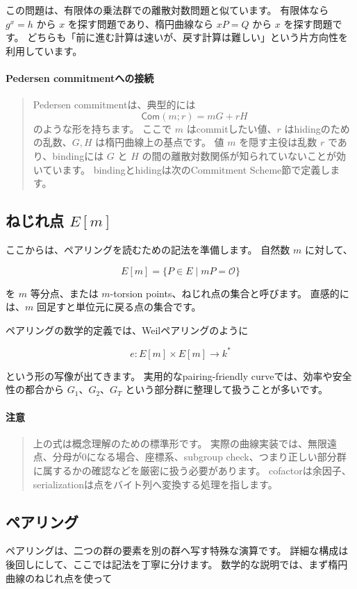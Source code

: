 \documentclass[a4paper,11pt]{ltjsarticle}
\newcommand{\Com}{\mathsf{Com}}
\newenvironment{examplebox}[1]{%
  \paragraph*{#1}\begin{quote}
}{%
  \end{quote}
}
\newenvironment{warnbox}{%
  \paragraph*{注意}\begin{quote}
}{%
  \end{quote}
}
\begin{document}
この問題は、有限体の乗法群での離散対数問題と似ています。
有限体なら \(g^x=h\) から \(x\) を探す問題であり、楕円曲線なら \(xP=Q\) から \(x\) を探す問題です。
どちらも「前に進む計算は速いが、戻す計算は難しい」という片方向性を利用しています。

\begin{examplebox}{Pedersen commitmentへの接続}
Pedersen commitmentは、典型的には
\[
  \Com(m;r)=mG+rH
\]
のような形を持ちます。
ここで \(m\) はcommitしたい値、\(r\) はhidingのための乱数、\(G,H\) は楕円曲線上の基点です。
値 \(m\) を隠す主役は乱数 \(r\) であり、bindingには \(G\) と \(H\) の間の離散対数関係が知られていないことが効いています。
bindingとhidingは次のCommitment Scheme節で定義します。
\end{examplebox}

\subsection{\texorpdfstring{ねじれ点 \(E[m]\)}{ねじれ点 E[m]}}

ここからは、ペアリングを読むための記法を準備します。
自然数 \(m\) に対して、

\[
  E[m]=\{P\in E\mid mP=\mathcal{O}\}
\]

を \(m\) 等分点、または \(m\)-torsion points、ねじれ点の集合と呼びます。
直感的には、\(m\) 回足すと単位元に戻る点の集合です。

ペアリングの数学的定義では、Weilペアリングのように

\[
  e:E[m]\times E[m]\to k^\ast
\]

という形の写像が出てきます。
実用的なpairing-friendly curveでは、効率や安全性の都合から \(G_1\)、\(G_2\)、\(G_T\) という部分群に整理して扱うことが多いです。

\begin{warnbox}
上の式は概念理解のための標準形です。
実際の曲線実装では、無限遠点、分母が0になる場合、座標系、subgroup check、つまり正しい部分群に属するかの確認などを厳密に扱う必要があります。
cofactorは余因子、serializationは点をバイト列へ変換する処理を指します。
\end{warnbox}

\subsection{ペアリング}

ペアリングは、二つの群の要素を別の群へ写す特殊な演算です。
詳細な構成は後回しにして、ここでは記法を丁寧に分けます。
数学的な説明では、まず楕円曲線のねじれ点を使って
\end{document}
